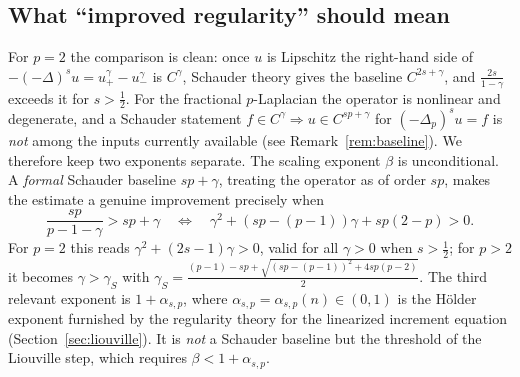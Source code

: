 \documentclass[11pt]{amsart}
\theoremstyle{plain}
\theoremstyle{definition}
\theoremstyle{remark}
\newcommand{\fpl}[1]{(-\Delta_p)^{s}#1}
\newcommand{\asp}{\alpha_{s,p}}
\begin{document}
\subsection{What ``improved regularity'' should mean}
For $p=2$ the comparison is clean: once $u$ is Lipschitz the right-hand side
of $-(-\Delta)^s u=u_+^\gamma-u_-^\gamma$ is $C^\gamma$, Schauder theory gives
the baseline $C^{2s+\gamma}$, and $\frac{2s}{1-\gamma}$ exceeds it for
$s>\tfrac12$. For the fractional $p$-Laplacian the operator is nonlinear and
degenerate, and a Schauder statement $f\in C^\gamma\Rightarrow u\in
C^{sp+\gamma}$ for $\fpl{u}=f$ is \emph{not} among the inputs currently
available (see Remark~\ref{rem:baseline}). We therefore keep two exponents
separate. The scaling exponent $\beta$ is unconditional. A \emph{formal}
Schauder baseline $sp+\gamma$, treating the operator as of order $sp$, makes
the estimate a genuine improvement precisely when
\begin{equation}\label{eq:improve}
  \frac{sp}{p-1-\gamma}>sp+\gamma
  \quad\Longleftrightarrow\quad
  \gamma^2+(sp-(p-1))\gamma+sp(2-p)>0 .
\end{equation}
For $p=2$ this reads $\gamma^2+(2s-1)\gamma>0$, valid for all $\gamma>0$ when
$s>\tfrac12$; for $p>2$ it becomes $\gamma>\gamma_S$ with
$\gamma_S=\frac{(p-1)-sp+\sqrt{(sp-(p-1))^2+4sp(p-2)}}{2}$.
The third relevant exponent is $1+\asp$, where $\asp=\asp(n)\in(0,1)$ is the
H\"older exponent furnished by the regularity theory for the linearized
increment equation (Section~\ref{sec:liouville}). It is \emph{not} a Schauder
baseline but the threshold of the Liouville step, which requires
$\beta<1+\asp$.
\end{document}

